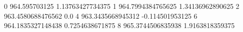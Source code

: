 0 964.595703125 1.13763427734375
1 964.7994384765625 1.34136962890625
2 963.4580688476562 0.0
4 963.3435668945312 -0.114501953125
6 964.1835327148438 0.7254638671875
8 965.3744506835938 1.9163818359375
